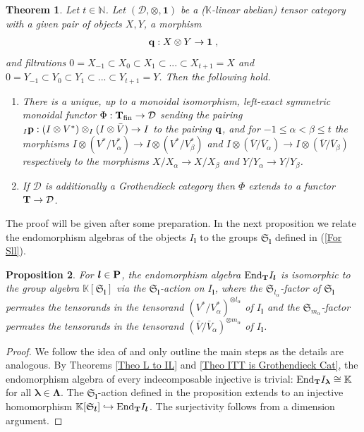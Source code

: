 \documentclass[12pt]{article}
\def\KK {{\mathbb K}}     %
\def\NN {{\mathbb N}}     %
\def\mc {\mathcal}
\def\mk {\mathfrak}
\newtheorem{theorem}{Theorem}[section]
\newtheorem{prop}[theorem]{Proposition}
\begin{document}
\begin{theorem}\label{Theo Univ IT}
Let $t\in\NN$. Let $(\mc D, \otimes, \bm 1)$ be a ($\KK$-linear abelian) tensor category with a given pair of objects $X,Y$, a morphism
\begin{gather}\label{For D pairing}
{\bf q}:X\otimes Y \to \bm 1 \;,
\end{gather}
and filtrations $0=X_{-1}\subset X_{0}\subset X_1\subset ... \subset X_{t+1}=X$ and $0=Y_{-1}\subset Y_{0}\subset Y_1\subset ... \subset Y_{t+1}=Y$. Then the following hold.
\begin{enumerate}
\item[{\rm (i)}] There is a unique, up to a monoidal isomorphism, left-exact symmetric monoidal functor $\Phi: {\bf T}_{\rm fin}\to \mc D$ sending the pairing ${_I}{\bf p}:(I \otimes V^*)\otimes_I (I\otimes \bar V)\to I$ to the pairing ${\bf q}$, and for $-1\leq\alpha<\beta\leq t$ the morphisms $I\otimes (V^*/V^*_{\alpha})\to I\otimes (V^*/V^*_\beta)$ and $I\otimes(\bar V/\bar V_{\alpha})\to I\otimes(\bar V/\bar V_\beta)$ respectively to the morphisms $X/X_{\alpha}\to X/X_\beta$ and $Y/Y_{\alpha}\to Y/Y_\beta$.
\item[{\rm (ii)}] If $\mc D$ is additionally a Grothendieck category then $\Phi$ extends to a functor ${\bf T}\to \mc D$. 
\end{enumerate}
\end{theorem}

The proof will be given after some preparation. In the next proposition we relate the endomorphism algebras of the objects $I_{\bm l}$ to the groups $\mk S_{\bm l}$ defined in (\ref{For Sll}).


\begin{prop}\label{Prop End Ilm in IT}
For $\bm l\in{\bf P}$, the endomorphism algebra ${\rm End}_{{\bf T}}I_{\bm l}$ is isomorphic to the group algebra $\KK[\mk S_{\bm l}]$ via the $\mk S_{\bm l}$-action on $I_{\bm l}$, where the $\mk S_{l_\alpha}$-factor of $\mk S_{\bm l}$ permutes the tensorands in the tensorand $(V^*/V^*_\alpha)^{\otimes l_\alpha}$ of $I_{\bm l}$ and the $\mk S_{m_\alpha}$-factor permutes the tensorands in the tensorand $(\bar V/\bar V_\alpha)^{\otimes m_\alpha}$ of $I_{\bm l}$.
\end{prop}

\begin{proof}
We follow the idea of \cite[Lemma 3.34]{Chirvasitu-Penkov-UTC} and only outline the main steps as the details are analogous. By Theorems \ref{Theo L to IL} and \ref{Theo ITT is Grothendieck Cat}, the endomorphism algebra of every indecomposable injective is trivial: ${\rm End}_{{\bf T}}I_{\bm\lambda}\cong \KK$ for all $\bm\lambda\in\bm\Lambda$. The $\mk S_{\bm l}$-action defined in the proposition extends to an injective homomorphism $\KK[\mk S_{\bm l}]\hookrightarrow{\rm End}_{{\bf T}}I_{\bm l}$. The surjectivity follows from a dimension argument. 
\end{proof}
\end{document}

